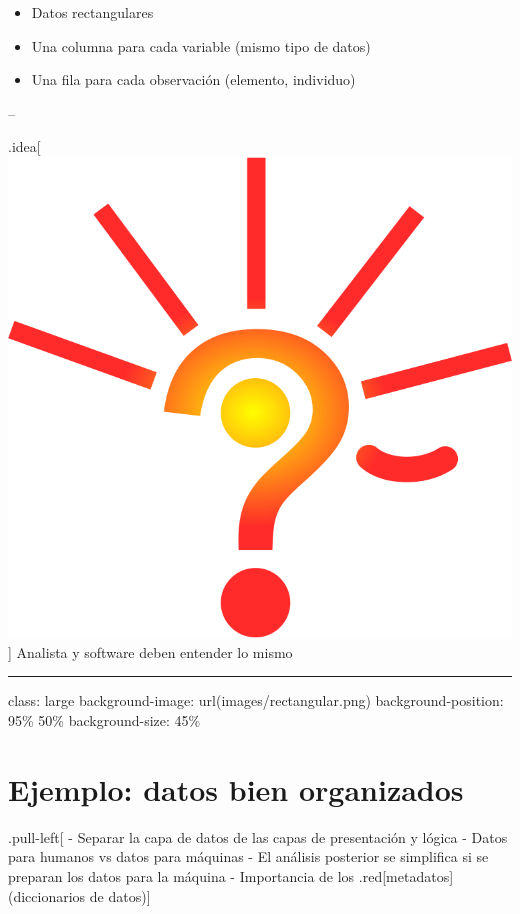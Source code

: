 \documentclass[
]{book}
\begin{document}
\begin{itemize}
\item
  Datos rectangulares
\item
  Una columna para cada variable (mismo tipo de datos)
\item
  Una fila para cada observación (elemento, individuo)
\end{itemize}

--

.idea{[}\includegraphics{./images/idea.png}{]} Analista y software deben entender lo mismo

\begin{center}\rule{0.5\linewidth}{0.5pt}\end{center}

class: large
background-image: url(images/rectangular.png)
background-position: 95\% 50\%
background-size: 45\%

\hypertarget{ejemplo-datos-bien-organizados}{%
\section{Ejemplo: datos bien organizados}\label{ejemplo-datos-bien-organizados}}

.pull-left{[}
- Separar la capa de datos de las capas de presentación y lógica
- Datos para humanos vs datos para máquinas
- El análisis posterior se simplifica si se preparan los datos para la máquina
- Importancia de los .red{[}metadatos{]} (diccionarios de datos){]}
\end{document}
